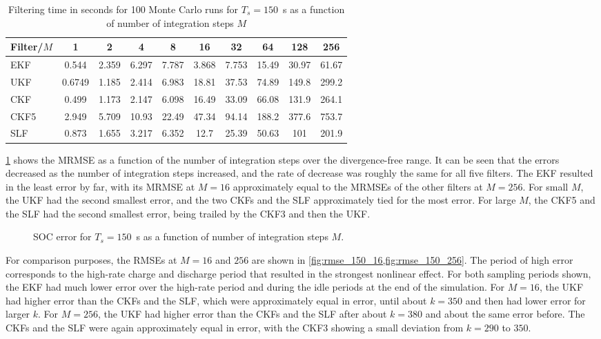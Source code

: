 \documentclass[../zhang_thesis.tex]{subfiles}
\begin{document}
\begin{table}[h]
\centering
\caption{Filtering time in seconds for 100 Monte Carlo runs for $T_s=150$~s as a function of number of integration steps $M$}
\begin{tabular}{@{}lccccccccc@{}}
\toprule
Filter/$M$ & 1      & 2     & 4     & 8     & 16    & 32    & 64    & 128   & 256   \\ \midrule
EKF        & 0.544  & 2.359 & 6.297 & 7.787 & 3.868 & 7.753 & 15.49 & 30.97 & 61.67 \\
UKF        & 0.6749 & 1.185 & 2.414 & 6.983 & 18.81 & 37.53 & 74.89 & 149.8 & 299.2 \\
CKF        & 0.499  & 1.173 & 2.147 & 6.098 & 16.49 & 33.09 & 66.08 & 131.9 & 264.1 \\
CKF5       & 2.949  & 5.709 & 10.93 & 22.49 & 47.34 & 94.14 & 188.2 & 377.6 & 753.7 \\
SLF        & 0.873  & 1.655 & 3.217 & 6.352 & 12.7  & 25.39 & 50.63 & 101   & 201.9 \\ \bottomrule
\end{tabular}
\label{tab:time_150}
\end{table}

\cref{fig:mrmse_150} shows the MRMSE as a function of the number of integration steps over the divergence-free range. It can be seen that the errors decreased as the number of integration steps increased, and the rate of decrease was roughly the same for all five filters. The EKF resulted in the least error by far, with its MRMSE at $M=16$ approximately equal to the MRMSEs of the other filters at $M=256$. For small $M$, the UKF had the second smallest error, and the two CKFs and the SLF
approximately tied for the most error. For large $M$, the CKF5 and the SLF had the second smallest error, being trailed by the CKF3 and then the UKF.

\begin{figure}[ht]
\centering
%
\caption{SOC error for $T_s=150$~s as a function of number of integration steps $M$.}
\label{fig:mrmse_150}
\end{figure}

For comparison purposes, the RMSEs at $M=16$ and $256$ are shown in \cref{fig:rmse_150_16,fig:rmse_150_256}. The period of high error corresponds to the high-rate charge and discharge period that resulted in the strongest nonlinear effect. For both sampling periods shown, the EKF had much lower error over the high-rate period and during the idle periods at the end of the simulation. For $M=16$, the UKF had higher error than the CKFs and the SLF, which were approximately equal in error, until about $k=350$ and then had lower error for
larger $k$. For $M=256$, the UKF had higher error than the CKFs and the SLF after about $k=380$ and about the same error before. The CKFs and the SLF were again approximately equal in error, with the CKF3 showing a small deviation from $k=290$ to $350$.
\end{document}

